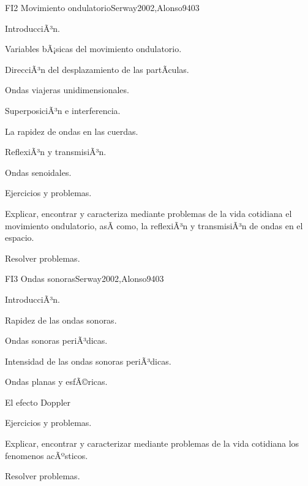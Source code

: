 \begin{syllabus}
\begin{unit}{FI2 Movimiento ondulatorio}{Serway2002,Alonso94}{0}{3}
\begin{topics}
      \item IntroducciÃ³n.
        \item Variables bÃ¡sicas del movimiento ondulatorio.
        \item DirecciÃ³n del desplazamiento de las partÃ­culas.
        \item Ondas viajeras unidimensionales.
        \item SuperposiciÃ³n e interferencia.
        \item La rapidez de ondas en las cuerdas.
        \item ReflexiÃ³n y transmisiÃ³n.
        \item Ondas senoidales.
        \item Ejercicios y problemas.
   \end{topics}
   \begin{unitgoals}
      \item Explicar, encontrar y caracteriza mediante problemas de la vida cotidiana el movimiento ondulatorio, asÃ­ como, la reflexiÃ³n y transmisiÃ³n de ondas en el espacio.
      \item Resolver problemas.
   \end{unitgoals}
\end{unit}

\begin{unit}{FI3 Ondas sonoras}{Serway2002,Alonso94}{0}{3}
\begin{topics}
      \item  IntroducciÃ³n.
        \item Rapidez de las ondas sonoras.
        \item Ondas sonoras periÃ³dicas.
        \item Intensidad de las ondas sonoras periÃ³dicas.
        \item Ondas planas y esfÃ©ricas.
        \item El efecto Doppler
        \item Ejercicios y problemas.
   \end{topics}
   \begin{unitgoals}
      \item Explicar, encontrar y caracterizar mediante problemas de la vida cotidiana los fenomenos acÃºsticos.
      \item Resolver problemas.
   \end{unitgoals}
\end{unit}


\end{syllabus}
